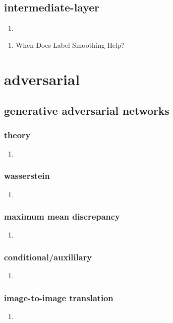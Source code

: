 \documentclass[acmlarge]{acmart}
\begin{document}
	\subsection{intermediate-layer}
	\begin{enumerate}
		\item
	\end{enumerate}
\begin{enumerate}
	\item When Does Label Smoothing Help? \cite{Mller2019WhenDL} 

\end{enumerate}
\section{adversarial}
	\subsection{generative adversarial networks}
		\subsubsection{theory}
		\begin{enumerate}
			\item
		\end{enumerate}
		\subsubsection{wasserstein}
		\begin{enumerate}
			\item
		\end{enumerate}
		\subsubsection{maximum mean discrepancy}
		\begin{enumerate}
			\item
		\end{enumerate}
		\subsubsection{conditional/auxililary}
		\begin{enumerate}
			\item
		\end{enumerate}
		\subsubsection{image-to-image translation}
		\begin{enumerate}
			\item
		\end{enumerate}
\end{document}
